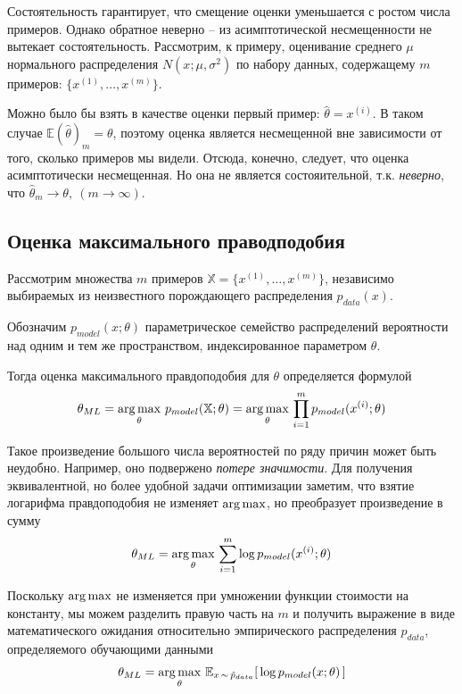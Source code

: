 \documentclass[%
	11pt,
	a4paper,
	utf8,
]{article}
\begin{document}
{\color{blue}Состоятельность гарантирует, что смещение оценки уменьшается с ростом числа примеров}. Однако обратное неверно -- {\color{red}из асимптотической несмещенности не вытекает состоятельность}. Рассмотрим, к примеру, оценивание среднего $ \mu $ нормального распределения $ N(x; \mu, \sigma^2) $ по набору данных, содержащему $ m $ примеров: $ \{ x^{(1)}, \ldots, x^{(m)} \} $.

Можно было бы взять в качестве оценки первый пример: $ \hat{\theta} = x^{(i)} $. В таком случае $ \mathbb{E}(\hat{\theta})_m = \theta $, поэтому оценка является несмещенной вне зависимости от того, сколько примеров мы видели. Отсюда, конечно, следует, что оценка асимптотически несмещенная. Но она не является состояительной, т.к. \emph{неверно}, что $ \hat{\theta}_m \to \theta, \ (m \to \infty) $.

\subsection{Оценка максимального праводподобия}

Рассмотрим множества $ m $ примеров $ \mathbb{X} = \{ x^{(1)}, \ldots, x^{(m)} \} $, независимо выбираемых из неизвестного порождающего распределения $ p_{data}(x) $.

Обозначим $ p_{model}(x; \theta) $ параметрическое семейство распределений вероятности над одним и тем же пространством, индексированное параметром $ \theta $. 

Тогда оценка максимального правдоподобия для $ \theta $ определяется формулой
\begin{align*}
	\theta_{ML} = \operatorname*{arg\,max}_{\theta} \, p_{model} (\mathbb{X}; \theta) = \operatorname*{arg\,max}_{\theta} \, \prod_{i=1}^{m} p_{model}(x^{(i)}; \theta)
\end{align*}

Такое произведение большого числа вероятностей по ряду причин может быть неудобно. Например, оно подвержено \emph{потере значимости}. Для получения эквивалентной, но более удобной задачи оптимизации заметим, что взятие логарифма правдоподобия не изменяет $ \operatorname*{arg\,max} $, но преобразует произведение в сумму
\begin{align*}
	\theta_{ML} = \operatorname*{arg\,max}_{\theta} \, \sum_{i=1}^{m} \log p_{model}(x^{(i)}; \theta)
\end{align*}

Поскольку $ \operatorname*{arg\,max} $ не изменяется при умножении функции стоимости на константу, мы можем разделить правую часть на $ m $ и получить выражение в виде математического ожидания относительно эмпирического распределения $ \hat{p}_{data} $, определяемого обучающими данными
\begin{align*}
	\theta_{ML} = \operatorname*{arg\,max}_{\theta} \, \mathbb{E}_{x \, \sim \, \hat{p}_{data}} [\, \log p_{model} (x; \theta) \,]
\end{align*}
\end{document}
